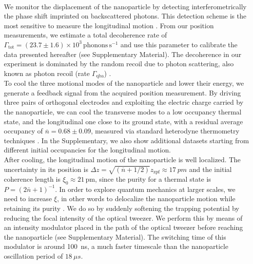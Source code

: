 \documentclass[aps,amssymb,amsmath,prl,superscriptaddress,reprint,noshowpacs]{revtex4-1}
\newcommand{\Gqba}{\Gamma_\mathrm{qba}}
\newcommand{\zzpf}{z_\mathrm{zpf}}
\begin{document}
%
\\
We monitor the displacement of the nanoparticle by detecting interferometrically the phase shift imprinted on backscattered photons.
%
This detection scheme is the most sensitive to measure the longitudinal motion \cite{tebbenjohanns_optimal_2019}.
%
From our position measurements, we estimate a total decoherence rate of $\Gamma_\mathrm{tot}=(23.7\pm 1.6)\times10^3\,\mathrm{phonons\,s^{-1}}$ and use this parameter to calibrate the data presented hereafter (see Supplementary Material).
%
The decoherence in our experiment is dominated by the random recoil due to photon scattering, also known as photon recoil (rate $\Gqba$) \cite{tebbenjohanns_quantum_2021,magrini_real-time_2021}.
\\
To cool the three motional modes of the nanoparticle and lower their energy, we generate a feedback signal from the acquired position measurement.
%
By driving three pairs of orthogonal electrodes and exploiting the electric charge carried by the nanoparticle, we can cool the transverse modes to a low occupancy thermal state, and the longitudinal one close to its ground state, with a residual average occupancy of $\overline{n} = 0.68\pm0.09$, measured via standard heterodyne thermometry techniques \cite{purdy_quantum_2017, tebbenjohanns_motional_2020}.
%
In the Supplementary, we also show additional datasets starting from different initial occupancies for the longitudinal motion.
\\
After cooling, the longitudinal motion of the nanoparticle is well localized. The uncertainty in its position is $\Delta z = \sqrt{(\overline{n}+1/2)} \zzpf \approx \SI{17}{pm}$ and the initial coherence length is $\xi_0\approx21\,\mathrm{pm}$, since the purity for a thermal state is $P=(2\bar{n}+1)^{-1}$.
%
In order to explore quantum mechanics at larger scales, we need to increase $\xi$, in other words to delocalize the nanoparticle motion while retaining its purity \cite{romero-isart_coherent_2017,weiss_large_2021}.
%
We do so by suddenly softening the trapping potential by reducing the focal intensity of the optical tweezer.
%
We perform this by means of an intensity modulator placed in the path of the optical tweezer before reaching the nanoparticle (see Supplementary Material).
%
The switching time of this modulator is around \SI{100}{ns}, a much faster timescale than the nanoparticle oscillation period of $\SI{18}{\mu s}$.
\end{document}
